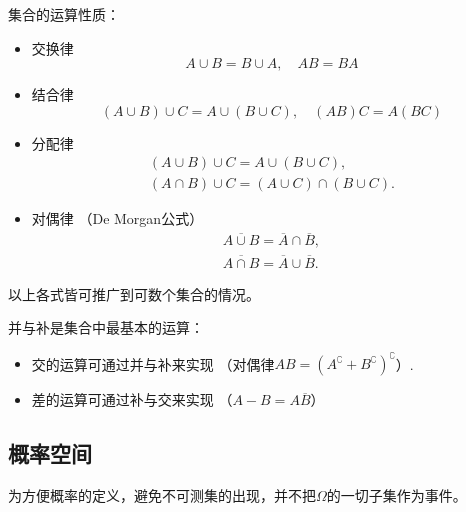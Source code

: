 \begin{property}
    集合的运算性质：
    \begin{itemize}
        \item 交换律
              \begin{equation}\label{eq:commutativity_set}
                  A \cup B = B \cup A, \quad AB = BA
              \end{equation}
        \item 结合律
              \begin{equation}
                  (A \cup B) \cup C = A \cup(B \cup C), \quad (AB)C = A(BC)\label{eq:associative_law_set}
              \end{equation}
        \item 分配律
              \begin{gather}
                  (A \cup B) \cup C = A \cup(B \cup C),\label{eq:distributive_law_set1}\\
                  (A \cap B) \cup C = (A \cup C) \cap(B \cup C).\label{eq:distributive_law_set2}
              \end{gather}
        \item 对偶律 （De Morgan公式）
              \begin{gather}
                  \overline{A \cup B} = \overline{A} \cap \overline{B},\label{eq:DeMorgan_law_set1}\\
                  \overline{A \cap B} = \overline{A} \cup \overline{B}.\label{eq:DeMorgan_law_set2}
              \end{gather}
    \end{itemize}
    以上各式皆可推广到可数个集合的情况。
\end{property}


\begin{remark}
    并与补是集合中最基本的运算：
    \begin{itemize}
        \item 交的运算可通过并与补来实现 （对偶律$AB = (A^{\complement} + B^{\complement})^{\complement}$）.
        \item 差的运算可通过补与交来实现 （$A - B = A\overline{B}$）
    \end{itemize}
\end{remark}

\subsection{概率空间}

为方便概率的定义，避免不可测集的出现，并不把$\Omega$的一切子集作为事件。

